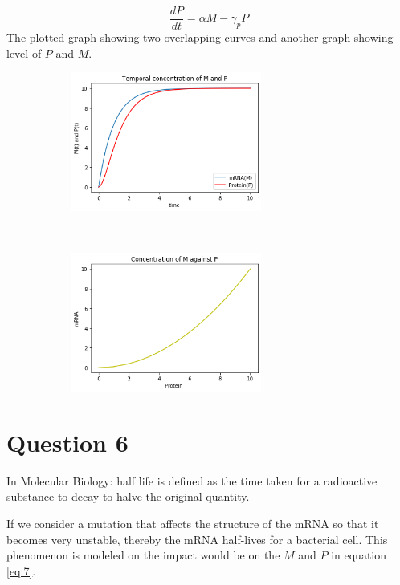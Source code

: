 \documentclass[12pt,a4paper]{article}
\begin{document}
\begin{equation}
  \frac{dP}{dt} = \alpha M - \gamma_p P
  \label{eq:6}
\end{equation}
The  plotted graph showing two overlapping curves and another graph showing level of $P$ and $M$.
\begin{figure}[th!]
    \centering
    \begin{subfigure}[t]{0.5\textwidth}
        \centering
        \includegraphics[height=1.8in]{./gaphics/q_5a.png}
    \end{subfigure}%
    ~ 
    \begin{subfigure}[t]{0.5\textwidth}
        \centering
        \includegraphics[height=1.8in]{./gaphics/q_5b.png}
    \end{subfigure}
   \caption{}
\end{figure}

\section*{Question 6}
In Molecular Biology: half life is defined as the time taken for a radioactive substance to decay to halve the original quantity.


If we consider a mutation that affects the structure of the mRNA so that it becomes very unstable,  thereby the mRNA half-lives for a bacterial cell. This phenomenon is modeled on the impact would be on the $M$ and $P$  in equation  \eqref{eq:7}.
\end{document}
